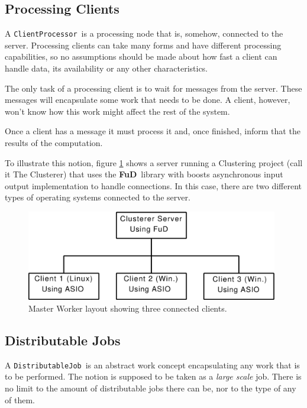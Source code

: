 \documentclass[a4paper,12pt,english]{report}
\newcommand{\fud}{\textbf{FuD}}
\renewcommand{\DJ}{\texttt{DistributableJob}}
\newcommand{\CP}{\texttt{ClientProcessor}}
\begin{document}
\subsection{Processing Clients}

A \CP \ is a processing node that is, somehow, connected to the server. Processing clients can take many forms and have different processing capabilities, so no assumptions should be made about how fast a client can handle data, its availability or any other characteristics.

The only task of a processing client is to wait for messages from the server. These messages will encapsulate some work that needs to be done. A client, however, won't know how this work might affect the rest of the system.

Once a client has a message it must process it and, once finished, inform that the results of the computation.

To illustrate this notion, figure \ref{master-worker} shows a server running a Clustering project (call it The Clusterer) that uses the \fud \ library with boosts asynchronous input output implementation to handle connections. In this case, there are two different types of operating systems connected to the server.

\begin{figure}[!ht]
\begin{center}
\includegraphics [width=11cm]{images/Master-Worker.eps}
\end{center}
\caption{Master Worker layout showing three connected clients.}
\label{master-worker}
\end{figure}

\subsection{Distributable Jobs}

A \DJ \ is an abstract work concept encapsulating any work that is to be performed. The notion is supposed to be taken as a \emph{large scale} job. There is no limit to the amount of distributable jobs there can be, nor to the type of any of them. 
\end{document}
